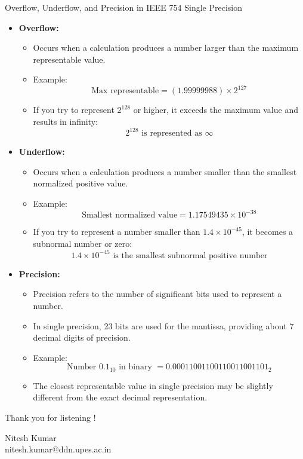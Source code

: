 \documentclass[aspectratio=169]{beamer}
\begin{document}
\begin{frame}[allowframebreaks]{Overflow, Underflow, and Precision in IEEE 754 Single Precision}
    \begin{itemize}
        \item \textbf{Overflow:}
        \begin{itemize}
            \item Occurs when a calculation produces a number larger than the maximum representable value.
            \item Example: 
            \[
            \text{Max representable} = (1.99999988) \times 2^{127}
            \]
            \item If you try to represent \( 2^{128} \) or higher, it exceeds the maximum value and results in infinity:
            \[
            2^{128} \text{ is represented as } \infty
            \]
        \end{itemize}
        
        \framebreak

        \item \textbf{Underflow:}
        \begin{itemize}
            \item Occurs when a calculation produces a number smaller than the smallest normalized positive value.
            \item Example: 
            \[
            \text{Smallest normalized value} = 1.17549435 \times 10^{-38}
            \]
            \item If you try to represent a number smaller than \( 1.4 \times 10^{-45} \), it becomes a subnormal number or zero:
            \[
            1.4 \times 10^{-45} \text{ is the smallest subnormal positive number}
            \]
        \end{itemize}

        \framebreak

        \item \textbf{Precision:}
        \begin{itemize}
            \item Precision refers to the number of significant bits used to represent a number.
            \item In single precision, 23 bits are used for the mantissa, providing about 7 decimal digits of precision.
            \item Example:
            \[
            \text{Number } 0.1_{10} \text{ in binary } = 0.00011001100110011001101_2
            \]
            \item The closest representable value in single precision may be slightly different from the exact decimal representation.
        \end{itemize}
    \end{itemize}
\end{frame}





\begin{frame}
\begin{center}
{ Thank you for listening !}
\vspace{1cm}

Nitesh Kumar \\[1em]
nitesh.kumar@ddn.upes.ac.in
\end{center}
\end{frame}
\end{document}
